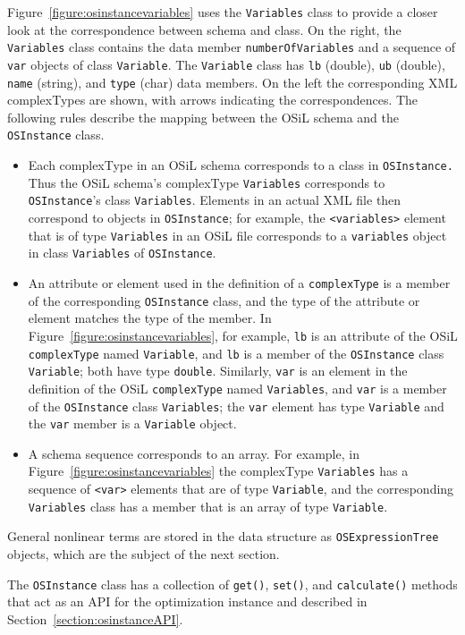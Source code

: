 \documentclass[11pt]{article}
\newcounter{Fig}
\renewcommand{\_}{{\char"5F}}
\renewcommand{\{}{{\char"7B}}
\renewcommand{\}}{{\char"7D}}
\renewcommand{\^}{{\char"0D}}
\renewcommand{\'}{{\char"0D}}
\newcommand{\Titem}{\item[$\triangleright$]}
\begin{document}
\begin{enumerate}[Step 1:]
Figure~\ref{figure:osinstancevariables} uses the {\tt Variables} class to provide a closer look at the correspondence 
between schema and class. On the right, the {\tt Variables} class contains the data member {\tt numberOfVariables} 
and a sequence of {\tt var} objects of class {\tt Variable}. The {\tt Variable} class has {\tt lb} (double), 
{\tt ub} (double), {\tt name} (string), and {\tt type} (char) data members. On the left the 
corresponding XML complexTypes are shown, with arrows indicating the correspondences. The following rules describe 
the mapping between the OSiL schema and the {\tt OSInstance} class.
%
\begin{itemize}

\Titem  Each complexType in an OSiL schema corresponds to a class in {\tt OSInstance.}
Thus the OSiL schema's complexType {\tt Variables} corresponds to {\tt OSInstance}'s class {\tt Variables}.
Elements in an actual XML file then correspond to objects in {\tt OSInstance};
for example, the {\tt <variables>} element that is of type {\tt Variables} in an OSiL file
corresponds to a {\tt variables} object in class {\tt Variables} of {\tt OSInstance}.

\Titem An attribute or element used in the definition of a {\tt complexType} is a member of the corresponding {\tt OSInstance} class, and the type of the attribute or element matches the type of the member.  In Figure~\ref{figure:osinstancevariables}, for example, {\tt lb} is an attribute of the OSiL {\tt complexType} named {\tt Variable}, and {\tt lb} is a member of the {\tt OSInstance} class {\tt Variable}; both have type {\tt double}.  Similarly, {\tt var} is an element in the definition of the OSiL {\tt complexType} named {\tt Variables}, and {\tt var} is a member of the {\tt OSInstance} class {\tt Variables}; the {\tt var} element has type {\tt Variable} and the {\tt var} member is a {\tt Variable} object.

\Titem A schema sequence corresponds to an array. For example, in Figure~\ref{figure:osinstancevariables} the complexType {\tt Variables} has a sequence of {\tt <var>} elements that are of type {\tt Variable}, and the corresponding {\tt Variables} class has a member that is an array of type {\tt Variable}.

\end{itemize}
%
General nonlinear terms are stored in the data structure as {\tt OSExpressionTree} objects, which are the subject of the next section.

     The {\tt OSInstance} class has a collection of {\tt get()}, {\tt set()}, and {\tt calculate()} methods that act as an API for the optimization instance and described in Section~\ref{section:osinstanceAPI}.





\end{enumerate}
\end{document}
